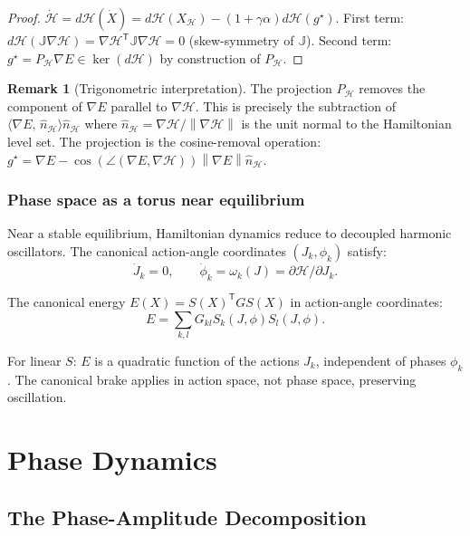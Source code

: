 \documentclass[11pt,a4paper,openany]{book}
\theoremstyle{definition}
\newtheorem{remark}[theorem]{Remark}
\newcommand{\T}{^{\mathsf{T}}}
\newcommand{\norm}[1]{\left\|#1\right\|}
\newcommand{\inner}[2]{\langle #1,\,#2\rangle}
\begin{document}
\begin{proof}
$\dot{\mathcal{H}} = d\mathcal{H}(\dot X) = d\mathcal{H}(X_\mathcal{H}) - (1+\gamma\alpha)d\mathcal{H}(g^\star)$.
First term: $d\mathcal{H}(\mathbb{J}\nabla\mathcal{H}) = \nabla\mathcal{H}\T\mathbb{J}\nabla\mathcal{H} = 0$ (skew-symmetry of $\mathbb{J}$).
Second term: $g^\star = P_\mathcal{H}\nabla E \in \ker(d\mathcal{H})$ by construction of $P_\mathcal{H}$.
\end{proof}

\begin{remark}[Trigonometric interpretation]
The projection $P_\mathcal{H}$ removes the component of $\nabla E$ parallel to $\nabla\mathcal{H}$.
This is precisely the subtraction of $\inner{\nabla E}{\hat n_\mathcal{H}}\hat n_\mathcal{H}$
where $\hat n_\mathcal{H} = \nabla\mathcal{H}/\norm{\nabla\mathcal{H}}$ is the unit normal to the
Hamiltonian level set. The projection is the cosine-removal operation:
$g^\star = \nabla E - \cos(\angle(\nabla E, \nabla\mathcal{H}))\norm{\nabla E}\hat n_\mathcal{H}$.
\end{remark}

\section{Phase space as a torus near equilibrium}

Near a stable equilibrium, Hamiltonian dynamics reduce to decoupled harmonic oscillators.
The canonical action-angle coordinates $(J_k, \phi_k)$ satisfy:
\[
\dot J_k = 0, \qquad \dot\phi_k = \omega_k(J) = \partial\mathcal{H}/\partial J_k.
\]

The canonical energy $E(X) = S(X)\T GS(X)$ in action-angle coordinates:
\[
E = \sum_{k,l} G_{kl} S_k(J,\phi)S_l(J,\phi).
\]

For linear $S$: $E$ is a quadratic function of the actions $J_k$, independent of phases $\phi_k$.
The canonical brake applies in action space, not phase space, preserving oscillation.

\part{Phase Dynamics}

\chapter{The Phase-Amplitude Decomposition}
\end{document}
